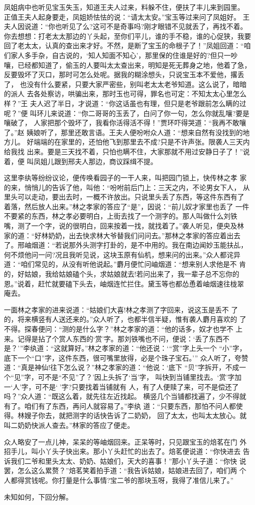 凤姐病中也听见宝玉失玉，知道王夫人过来，料躲不住，便扶了丰儿来到园里。
正值王夫人起身要走，凤姐娇怯怯的说：“请太太安。”宝玉等过来问了凤姐好。
王夫人因说道：“你也听见了么?这可不是奇事吗?刚才眼错不见就丢了，再找不着。
你去想想：打老太太那边的丫头起，至你们平儿，谁的手不稳，谁的心促狭，我要
回了老太太，认真的查出来才好。不然，是断了宝玉的命根子了！”凤姐回道：“咱
们家人多手杂，自古说的，‘知人知面不知心’，那里保的住谁是好的?但只一吵
嚷，已经都知道了，偷玉的人要叫太太查出来，明知是死无葬身之地，他着了急，
反要毁坏了灭口，那时可怎么处呢。据我的糊涂想头，只说宝玉本不爱他，撂丢了，
也没有什么要紧，只要大家严密些，别叫老太太老爷知道。这么说了，暗暗的派人
去各处察访，哄骗出来，那时玉也可得，罪名也可定：不知太太心里怎么样？”王
夫人迟了半日，才说道：“你这话虽也有理，但只是老爷跟前怎么瞒的过呢？”便
叫环儿来说道：“你二哥哥的玉丢了，白问了你一句，怎么你就乱嚷?要是嚷破了，
人家把那个毁坏了，我看你活得活不得！”贾环吓得哭道：“我再不敢嚷了。”赵
姨娘听了，那里还敢言语。王夫人便吩咐众人道：“想来自然有没找到的地方儿。
好端端的在家里的，还怕他飞到那里去不成?只是不许声张。限袭人三天内给我找
出来。要是三天找不着，只怕也瞒不住，大家那就不用过安静日子了！”说着，便
叫凤姐儿跟到邢夫人那边，商议踩缉不提。

这里李纨等纷纷议论，便传唤看园子的一干人来，叫把园门锁上，快传林之孝
家的来，悄悄儿的告诉了他，叫他：“吩咐前后门上：三天之内，不论男女下人，
从里头可以走动，要出去时，一概不许放出。只说里头丢了东西，等这件东西有了
着落，然后放人出来。”林之孝家的答应了“是”，因说：“前儿奴才家里也丢了
一件不要紧的东西，林之孝必要明白，上街去找了一个测字的。那人叫做什么刘铁
嘴，测了一个字，说的很明白，回来按着一找，就找着了。”袭人听见，便央及林
家的道：“好林奶奶，出去快求林大爷替我们问问去。”那林之孝家的答应着出去
了。邢岫烟道：“若说那外头测字打卦的，是不中用的。我在南边闻妙玉能扶乩，
何不烦他问一问?况且我听见说，这块玉原有仙机，想来问的出来。”众人都诧异
道：“咱们常见的，从没有听他说起。”麝月便忙问岫烟道：“想来别人求他是不
肯的，好姑娘，我给姑娘磕个头，求姑娘就去!若问出来了，我一辈子总不忘你的
恩。”说着，赶忙就要磕下头去，岫烟连忙拦住。黛玉等也都怂恿着岫烟速往栊翠
庵去。

一面林之孝家的进来说道：“姑娘们大喜!林之孝测了字回来，说这玉是丢不
了的，将来横竖有人送还来的。”众人听了，也都半信半疑，惟有袭人麝月喜欢的
了不得。探春便问：“测的是什么字？”林之孝家的道：“他的话多，奴才也学不
上来。记得是拈了个赏人东西的‘赏’字。那刘铁嘴也不问，便说：‘丢了东西不
是？’”李纨道：“这就算好。”林之孝家的道：“他还说：‘“赏”字上头一个
“小”字，底下一个“口”字，这件东西，很可嘴里放得，必是个珠子宝石。’”
众人听了，夸赞道：“真是神仙!往下怎么说？”林之孝家的道：“他说：‘底下
“贝”字拆开，不成一个“见”字，可不是“不见”了？’因上头拆了‘当’字，
叫快到当铺里找去。‘赏’字加一‘人’字，可不是‘’字?只要找着当铺就有
人，有了人便赎了来，可不是偿还了吗？”众人道：“既这么着，就先往左近找起。
横竖几个当铺都找遍了，少不得就有了。咱们有了东西，再问人就容易了。”李纨
道：“只要东西，那怕不问人都使得。林嫂子你去，就把测字的话快告诉了二奶奶，
回了太太，也叫太太放心。就叫二奶奶快派人查去。”林家的答应了便走。

众人略安了一点儿神，呆呆的等岫烟回来。正呆等时，只见跟宝玉的焙茗在门
外招手儿，叫小丫头子快出来。那小丫头赶忙的出去了。焙茗便说道：“你快进去
告诉我们二爷和里头太太、奶奶、姑娘们，天大的喜事！”那小丫头子道：“你快
说罢，怎么这么累赘？”焙茗笑着拍手道：“我告诉姑娘，姑娘进去回了，咱们两
个人都得赏钱呢。你打量是什么事情?宝二爷的那块玉呀，我得了准信儿来了。”

未知如何，下回分解。